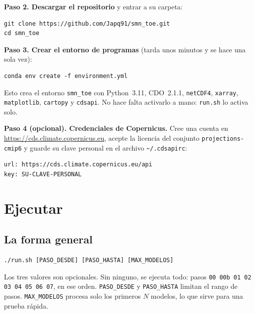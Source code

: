 \documentclass[11pt,a4paper]{article}
\newcommand{\archivo}[1]{\begingroup\hypersetup{urlcolor=black}\url{#1}\endgroup}
\begin{document}
\textbf{Paso 2. Descargar el repositorio} y entrar a su carpeta:
\begin{lstlisting}
git clone https://github.com/Japq91/smn_toe.git
cd smn_toe
\end{lstlisting}

\textbf{Paso 3. Crear el entorno de programas} (tarda unos minutos y se hace una sola vez):
\begin{lstlisting}
conda env create -f environment.yml
\end{lstlisting}
Esto crea el entorno \texttt{smn\_toe} con Python~3.11, CDO~2.1.1, \texttt{netCDF4}, \texttt{xarray}, \texttt{matplotlib}, \texttt{cartopy} y \texttt{cdsapi}. No hace falta activarlo a mano: \texttt{run.sh} lo activa solo.

\textbf{Paso 4 (opcional). Credenciales de Copernicus.} Cree una cuenta en \archivo{https://cds.climate.copernicus.eu}, acepte la licencia del conjunto \texttt{projections-cmip6} y guarde su clave personal en el archivo \texttt{\textasciitilde/.cdsapirc}:
\begin{lstlisting}
url: https://cds.climate.copernicus.eu/api
key: SU-CLAVE-PERSONAL
\end{lstlisting}

\section{Ejecutar}
\label{sec:ejecutar}

\subsection{La forma general}

\begin{lstlisting}
./run.sh [PASO_DESDE] [PASO_HASTA] [MAX_MODELOS]
\end{lstlisting}

Los tres valores son opcionales. Sin ninguno, se ejecuta todo: pasos \texttt{00 00b 01 02 03 04 05 06 07}, en ese orden. \texttt{PASO\_DESDE} y \texttt{PASO\_HASTA} limitan el rango de pasos. \texttt{MAX\_MODELOS} procesa solo los primeros $N$ modelos, lo que sirve para una prueba rápida.
\end{document}
